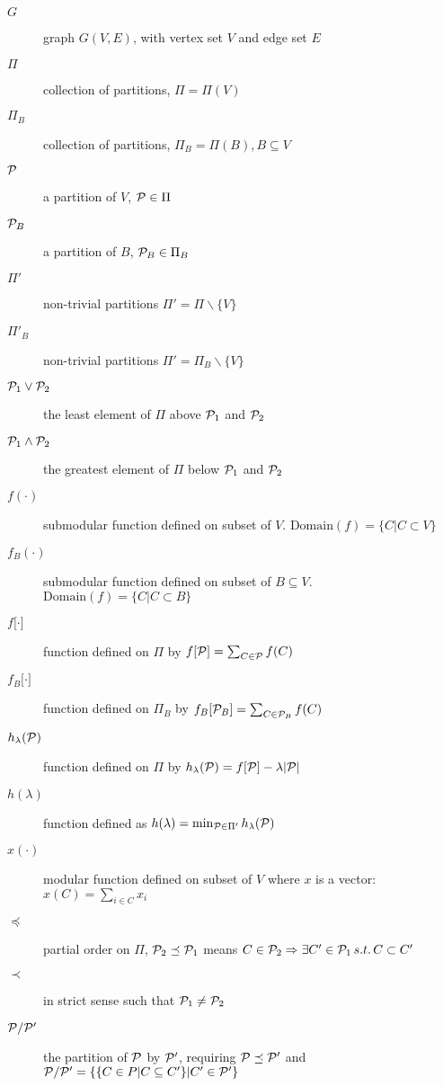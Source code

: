\begin{description}
\item[$G$] graph $G(V,E)$, with vertex set $V$ and edge set $E$
\item[$\Pi$] collection of partitions, $\Pi = \Pi(V)$
\item[$\Pi_B$] collection of partitions, $\Pi_B = \Pi(B), B\subseteq V$
\item[$\P$] a partition of $V$, $\P \in \Pi$
\item[$\P_B$] a partition of $B$, $\P_B \in \Pi_B$
\item[$\Pi'$] non-trivial partitions $\Pi' = \Pi \backslash \{V\}$
\item[$\Pi'_B$] non-trivial partitions $\Pi' = \Pi_B \backslash \{V\}$
\item[$\P_1 \vee \P_2$] the least element of $\Pi$ above $\P_1$ and $\P_2$
\item[$\P_1 \wedge \P_2$] the greatest element of $\Pi$ below $\P_1$ and $\P_2$
\item[$f(\cdot)$] submodular function defined on subset of $V$. $\mathrm{Domain}(f)=\{C| C\subset V\}$
\item[$f_B(\cdot)$] submodular function defined on subset of $B\subseteq V$. $\mathrm{Domain}(f)=\{C| C\subset B\}$
\item[$f{[}\cdot{]}$] function defined on $\Pi$ by $f[\P] = \sum_{C\in \P} f(C)$
\item[$f_B{[}\cdot{]}$] function defined on $\Pi_B$ by $f_B[\P_B] = \sum_{C\in \P_B} f(C)$
\item[$h_{\lambda}(\P)$] function defined on $\Pi$ by $h_{\lambda}(\P)=f[\P]-\lambda\abs{\P}$
\item[$h(\lambda)$] function defined as $ h(\lambda) = \min_{\P \in \Pi'} h_{\lambda}(\P)$
\item[$x(\cdot)$] modular function defined on subset of $V$ where $x$ is a vector: $x(C)=\sum_{i \in C} x_i$
\item[$\preceq$] partial order on $\Pi$, $\P_2 \preceq \P_1$ means $C\in \P_2 \Rightarrow \exists C' \in \P_1 \,s.t.\, C \subset C'$
\item[$\prec$] in strict sense such that $\P_1 \neq \P_2 $
\item[$\P/\P'$] the partition of $\P$ by $\P'$, requiring $\P\preceq \P'$ and $\P/\P'=\{\{ C \in P | C \subseteq C' \} | C' \in \P'\}$
\end{description}

